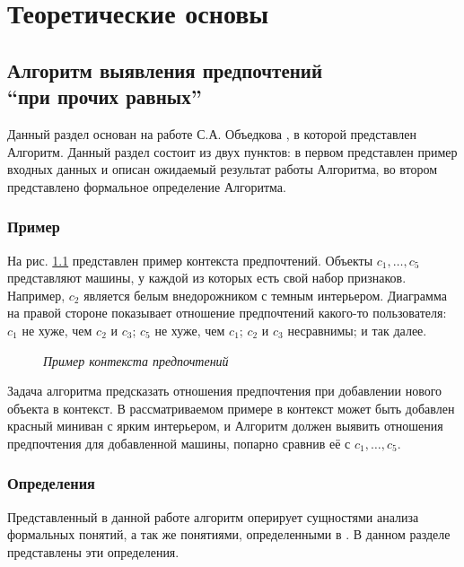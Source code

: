 \chapter{Теоретические основы}
\label{chapter:theory}

	
\section[Алгоритм выявления предпочтений \enquote{при прочих равных}]{ Алгоритм выявления предпочтений \\ \enquote{при прочих равных}}

	Данный раздел основан на работе С.А. Объедкова \cite{Obiedkov:2013}, в которой представлен Алгоритм. Данный раздел состоит из двух пунктов: в первом представлен пример входных данных и описан ожидаемый результат работы Алгоритма, во втором представлено формальное определение Алгоритма.
	
	\subsection{Пример}
	\label{subsection:example}
		На рис. \ref{fig:pcxt} представлен пример контекста предпочтений. Объекты $c_1, \dotsc, c_5$ представляют машины, у каждой из которых есть свой набор признаков. Например, $c_2$ является белым внедорожником с темным интерьером. Диаграмма на правой стороне показывает отношение предпочтений какого-то пользователя: $c_1$ не хуже, чем $c_2$ и $c_3$; $c_5$ не хуже, чем $c_1$; $c_2$ и $c_3$ несравнимы; и так далее. 
		\begin{figure}
			\begin{center} 
				\cars \prefs
				\caption{\it Пример контекста предпочтений \cite[Рис.~1.1]{Obiedkov:2013}}
				\label{fig:pcxt}	
			\end{center} 
		\end{figure} 
		
		Задача алгоритма предсказать отношения предпочтения при добавлении нового объекта в контекст. В рассматриваемом примере в контекст может быть добавлен красный миниван с ярким интерьером, и Алгоритм должен выявить отношения предпочтения для добавленной машины, попарно сравнив её с $c_1, \dotsc, c_5$. 
	
	\subsection{Определения}
	\label{subsection:definitions}
		Представленный в данной работе алгоритм оперирует сущностями анализа формальных понятий\cite{Ganter:1999}, а так же понятиями, определенными в \cite{Obiedkov:2012:preferences,Obiedkov:2012:modeling}. В данном разделе представлены эти определения.
		
